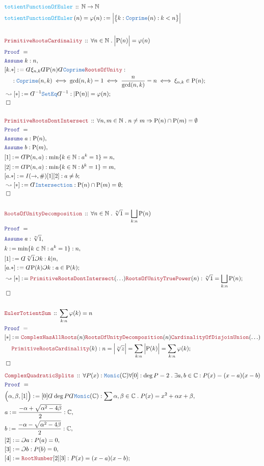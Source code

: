 \documentclass[12pt]{scrartcl}
\newcommand{\TYPE}[1]{\textcolor{NavyBlue}{\mathtt{#1}}}
\newcommand{\FUNC}[1]{\textcolor{Cerulean}{\mathtt{#1}}}
\newcommand{\LOGIC}[1]{\textcolor{Blue}{\mathtt{#1}}}
\newcommand{\THM}[1]{\textcolor{Maroon}{\mathtt{#1}}}
\renewcommand{\.}{\; . \;}
\newcommand{\de}{: \kern 0.1pc =}
\newcommand{\Act}[1]{\left( #1 \right)}
\newcommand{\Theorem}[2]{& \THM{#1} \, :: \, #2 \\ & \Proof = \\ }
\newcommand{\DeclareFunc}[2]{& \FUNC{#1} \, :: \, #2 \\}
\newcommand{\DefineNamedFunc}[4]{&  \FUNC{#1}\Act{#2} = #3 \de #4 \\}
\newcommand{\NewLine}{\\ & \kern 1pc}
\newcommand{\Page}[1]{ \begin{align*} #1 \end{align*}   }
\newcommand{ \bd }{ \ByDef }
\newcommand{\Imply}{\Rightarrow}
\newcommand{\Complex}{\mathbb{C}}
\newcommand{\Nat}{\mathbb{N} }
\newcommand{\Say}[3]{& #1 \de #2 : #3, \\}
\newcommand{\Conclude}[3]{& #1 \de #2 : #3; \\}
\newcommand{\DeriveConclude}[3]{& \leadsto #1 \de #2 : #3 ; \\}
\newcommand{\Assume}[2]{& \LOGIC{Assume} \; #1 : #2, \\}
\newcommand{\QED}{\; \square}
\newcommand{\EndProof}{& \QED \\}
\newcommand{\ByDef}{\rotatebox[origin=c]{-180}{$D$}}%
\newcommand{\ByConstr}{\rotatebox[origin=c]{-180}{$C$}}%
\newcommand{\Proof}{\LOGIC{Proof} \; }
\begin{document}
\Page{
	\DeclareFunc{totientFunctionOfEuler}{\Nat \to \Nat}
	\DefineNamedFunc{totientFunctionOfEuler}{n}{\varphi(n)}{\Big|\big\{ k : \TYPE{Coprime}(n) : k < n \big\} \Big|}
	\\
	\Theorem{PrimitiveRootsCardinality}{\forall n \in \Nat \.  \Big|\mathrm{P}(n)\Big| = \varphi(n) }
	\Assume{k}{n}
	\Conclude{[k.*]}{\bd \xi_{n,k} \bd \mathrm{P}(n) \bd \TYPE{Coprime}\THM{RootsOfUnity}}
	{ \NewLine : \TYPE{Coprime}(n,k) \iff  \mathrm{gcd}(n,k) = 1  \iff \frac{n}{\mathrm{gcd}(n,k)} = n  \iff \xi_{n,k} \in \mathrm{P}(n)}
	\DeriveConclude{[*]}{\bd^{-1} \TYPE{SetEq}\bd^{-1}\TYPE{}}{|\mathrm{P}(n)| = \varphi(n) }
	\EndProof
	\\
	\Theorem{PrimitiveRootsDontIntersect}
	{
		\forall n,m \in \Nat \.  n \neq m \Imply \mathrm{P}(n) \cap \mathrm{P}(m) =\emptyset
	}
	\Assume{a}{\mathrm{P}(n)}
	\Assume{b}{\mathrm{P}(m)}
	\Say{[1]}{\bd \mathrm{P}(n,a)}{\min \{  k \in \Nat : a^k = 1 \} = n  }
	\Say{[2]}{\bd \mathrm{P}(n,a)}{\min \{  k \in \Nat  : b^k = 1 \} = m  }
	\Conclude{[a.*]}{I(\to,\#)[1][2]}{a \neq b}
	\DeriveConclude{[*]}{\bd \TYPE{Intersection}}{\mathrm{P}(n) \cap \mathrm{P}(m) =\emptyset}
	\EndProof
	\\
	\Theorem{RootsOfUnityDecomposition}
	{
		\forall n \in \Nat \.  \sqrt[n]{1}  = \bigsqcup_{k : n} \mathrm{P}(n)
	}
	\Assume{a}{\sqrt[n]{1}}
	\Say{k}{\min \{  k \in \Nat : a^k = 1 \}}{n}
	\Say{[1]}{\bd \sqrt[n]{1}\ByConstr k}{ k | n}
	\Conclude{[a.*]}{\bd \mathrm{P}(k) \ByConstr k }{a \in \mathrm{P}(k)}
	\DeriveConclude{[*]}{\THM{PrimitiveRootsDontIntersect}(\ldots)\THM{RootsOfUnityTruePower}(n)}
	{
		 \sqrt[n]{1}  = \bigsqcup_{k : n} \mathrm{P}(n)
	}
	\EndProof
	\\
	\Theorem{EulerTotientSum}{\sum_{k : n} \varphi(k) = n}
	\Conclude{[*]}
	{\THM{ComplexHasAllRoots}(n) \THM{RootsOfUnityDecomposition}(n) \THM{CardinalityOfDisjoinUnion}(\ldots)\NewLine\THM{PrimitiveRootsCardinality}(k)}
	{n = \Big| \sqrt[n]{z} \Big| = \sum_{k:n} \Big| \mathrm{P}(k) \Big| =  \sum_{k:n} \varphi(k) }
	\EndProof
}\Page{
	\Theorem{ComplexQuadraticSplits}
	{
		\forall P(x)  : \TYPE{Monic}(\Complex)
		\forall [0] : \deg P = 2 \.
		\exists a,b \in \Complex : 
		P(x) = (x - a)(x - b)
	}
	\Say{\Big(\alpha,\beta,[1]\Big)}{[0]\bd \deg P \bd \TYPE{Monic}(\Complex)}
	{
		\sum \alpha,\beta \in \Complex \.
		P(x) = x^2 + \alpha x + \beta
	}
	\Say{a}{\frac{-\alpha + \sqrt{\alpha^2 - 4\beta}}{2}}{\Complex}
	\Say{b}{\frac{-\alpha - \sqrt{\alpha^2 - 4\beta}}{2}}{\Complex}
	\Say{[2]}{\ByConstr a}{P(a) = 0}
	\Say{[3]}{\ByConstr b }{P(b) = 0}
	\Conclude{[4]}{\THM{RootNumber}[2][3]}{P(x) = (x-a)(x-b)}
}
\end{document}
